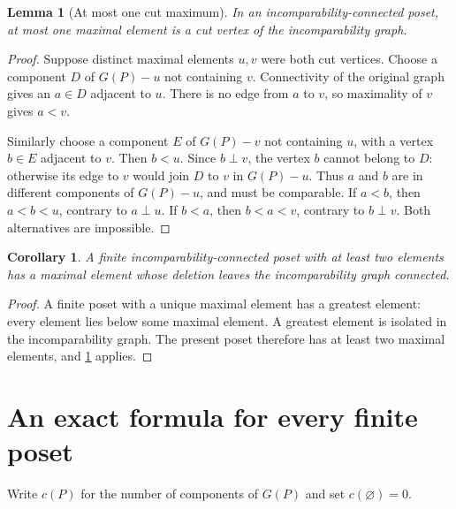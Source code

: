 \documentclass[11pt,a4paper]{article}
\newtheorem{lemma}[lemma]{Lemma}
\newtheorem{corollary}[corollary]{Corollary}
\theoremstyle{definition}
\theoremstyle{remark}
\newcommand{\inc}{\mathbin{\perp}}
\begin{document}
\begin{lemma}[At most one cut maximum]\label{lem:cut}
In an incomparability-connected poset, at most one maximal element is a cut
vertex of the incomparability graph.
\end{lemma}
\begin{proof}
Suppose distinct maximal elements $u,v$ were both cut vertices. Choose a
component $D$ of $G(P)-u$ not containing $v$. Connectivity of the original
graph gives an $a\in D$ adjacent to $u$. There is no edge from $a$ to $v$,
so maximality of $v$ gives $a<v$.

Similarly choose a component $E$ of $G(P)-v$ not containing $u$, with a
vertex $b\in E$ adjacent to $v$. Then $b<u$. Since $b\inc v$, the vertex
$b$ cannot belong to $D$: otherwise its edge to $v$ would join $D$ to $v$
in $G(P)-u$. Thus $a$ and $b$ are in different components of $G(P)-u$, and
must be comparable. If $a<b$, then $a<b<u$, contrary to $a\inc u$. If
$b<a$, then $b<a<v$, contrary to $b\inc v$. Both alternatives are impossible.
\end{proof}

\begin{corollary}\label{cor:finite-noncut}
A finite incomparability-connected poset with at least two elements has a
maximal element whose deletion leaves the incomparability graph connected.
\end{corollary}
\begin{proof}
A finite poset with a unique maximal element has a greatest element: every
element lies below some maximal element. A greatest element is isolated in
the incomparability graph. The present poset therefore has at least two
maximal elements, and \cref{lem:cut} applies.
\end{proof}

\section{An exact formula for every finite poset}\label{sec:finite}

Write $c(P)$ for the number of components of $G(P)$ and set $c(\varnothing)=0$.
\end{document}
